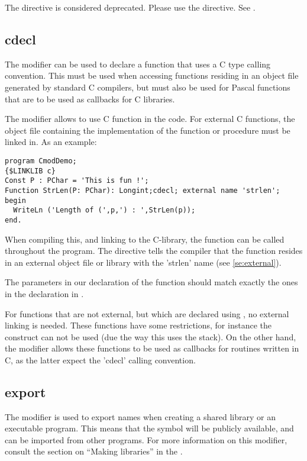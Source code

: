 \begin{remark}
The  directive is considered deprecated. Please use the
 directive. See .
\end{remark}

\subsection{cdecl}
\label{se:cdecl}
The  modifier can be used to declare a function that uses a C
type calling convention. This must be used when accessing functions residing in
an object file generated by standard C compilers, but must also be used for
Pascal functions that are to be used as callbacks for C libraries. 

The  modifier allows to use C function in the code. 
For external C functions, the object file containing the  
implementation of the function or procedure must be linked in.
As an example:
\begin{verbatim}
program CmodDemo;
{$LINKLIB c}
Const P : PChar = 'This is fun !';
Function StrLen(P: PChar): Longint;cdecl; external name 'strlen';
begin
  WriteLn ('Length of (',p,') : ',StrLen(p));
end.
\end{verbatim}
When compiling this, and linking to the C-library, the  function
can be called throughout the program. The  directive tells
the compiler that the function resides in an external object file or library
with the 'strlen' name (see \ref{se:external}).
\begin{remark}
The parameters in our declaration of the  function should
match exactly the ones in the declaration in .
\end{remark}

For functions that are not external, but which are declared using
, no external linking is needed. These functions have some
restrictions, for instance the  construct can not be
used (due the way this uses the stack). On the other hand, the
 modifier allows these functions to be used as callbacks for 
routines written in C, as the latter expect the 'cdecl' calling convention.

\subsection{export}
The  modifier is used to export names when creating a shared library
or an executable program. This means that the symbol will be publicly
available, and can be imported from other programs. For more information
on this modifier, consult the section on ``Making libraries''
in the \progref.

